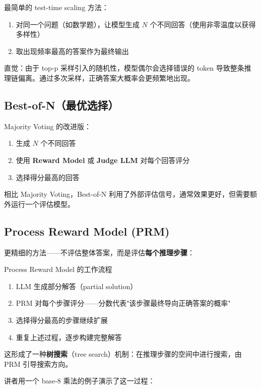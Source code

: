 \documentclass[a4paper]{article}
\begin{document}
最简单的 test-time scaling 方法：

\begin{enumerate}
    \item 对同一个问题（如数学题），让模型生成 $N$ 个不同回答（使用非零温度以获得多样性）
    \item 取出现频率最高的答案作为最终输出
\end{enumerate}

直觉：由于 top-p 采样引入的随机性，模型偶尔会选择错误的 token 导致整条推理链偏离。通过多次采样，正确答案大概率会更频繁地出现。

\subsection{Best-of-N（最优选择）}

Majority Voting 的改进版：

\begin{enumerate}
    \item 生成 $N$ 个不同回答
    \item 使用 \textbf{Reward Model} 或 \textbf{Judge LLM} 对每个回答评分
    \item 选择得分最高的回答
\end{enumerate}

相比 Majority Voting，Best-of-N 利用了外部评估信号，通常效果更好，但需要额外运行一个评估模型。

\subsection{Process Reward Model (PRM)}

更精细的方法——不评估整体答案，而是评估\textbf{每个推理步骤}：

\begin{importantbox}{Process Reward Model 的工作流程}
\begin{enumerate}
    \item LLM 生成部分解答（partial solution）
    \item PRM 对每个步骤评分——分数代表"该步骤最终导向正确答案的概率"
    \item 选择得分最高的步骤继续扩展
    \item 重复上述过程，逐步构建完整解答
\end{enumerate}
这形成了一种\textbf{树搜索}（tree search）机制：在推理步骤的空间中进行搜索，由 PRM 引导搜索方向。
\end{importantbox}

讲者用一个 base-8 乘法的例子演示了这一过程：
\end{document}
